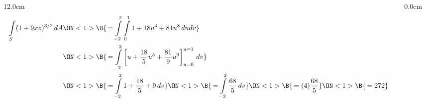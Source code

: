 \begin{frame}
\begin{columns}
\begin{column}{12.0cm}
\begin{align*} 
	\int \limits_{S} (1 + 9xz)^{3/2} \, dA
	&\ON<1>{\B{\, = \int \limits_{-2}^{2}\int \limits_{0}^{1} 1 + 18u^4 + 81u^8 \, dudv}} \\
	&\ON<1>{\B{\, = \int \limits_{-2}^{2} \left[u + \frac{18}{5}u^5 + \frac{81}{9}u^9 \right]_{u=0}^{u=1} \, dv}} \\
	&\ON<1>{\B{\, = \int \limits_{-2}^{2} 1 + \frac{18}{5} + 9 \, dv}}
	\ON<1>{\B{\, = \int \limits_{-2}^{2} \frac{68}{5} \, dv}}
	\ON<1>{\B{\, = (4)\frac{68}{5}}} 
	\ON<1>{\B{\, = 272}}
\end{align*}

\end{column}\begin{column}{0.0cm}\end{column}\end{columns}
\end{frame}

